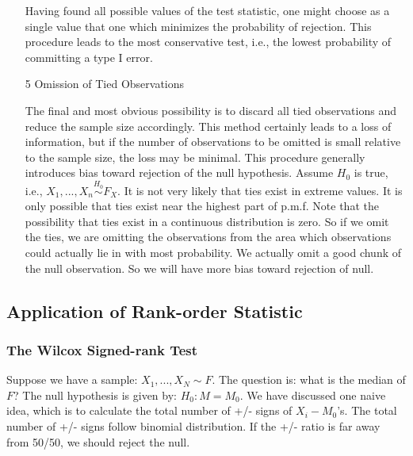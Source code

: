 \documentclass[twoside]{article}
\begin{document}
\begin{itemize}
	Having found all possible values of the test statistic, one might choose as a single value that one which minimizes the probability of rejection. This procedure leads to the most conservative test, i.e., the lowest probability of committing a type I error. 
	\item[5] Omission of Tied Observations
	
	The final and most obvious possibility is to discard all tied observations and reduce the sample size accordingly. This method certainly leads to a loss of information, but if the number of observations to be omitted is small relative to the sample size, the loss may be minimal. This procedure generally introduces bias toward rejection of the null hypothesis. Assume $H_0$ is true, i.e., $X_1, ..., X_n \stackrel{H_0}{\sim} F_X$. It is not very likely that ties exist in extreme values. It is only possible that ties exist near the highest part of p.m.f. Note that the possibility that ties exist in a continuous distribution is zero. So if we omit the ties, we are omitting the observations from the area which observations could actually lie in with most probability. We actually omit a good chunk of the null observation. So we will have more bias toward rejection of null. 
\end{itemize}


\subsection{Application of Rank-order Statistic}
\subsubsection{The Wilcox Signed-rank Test}
Suppose we have a sample: $X_1, ..., X_N \sim F$. The question is: what is the median of $F$? The null hypothesis is given by: $H_0: M = M_0$. We have discussed one naive idea, which is to calculate the total number of +/- signs of $X_i - M_0$'s. The total number of +/- signs follow binomial distribution. If the +/- ratio is far away from 50/50, we should reject the null. 
\end{document}
